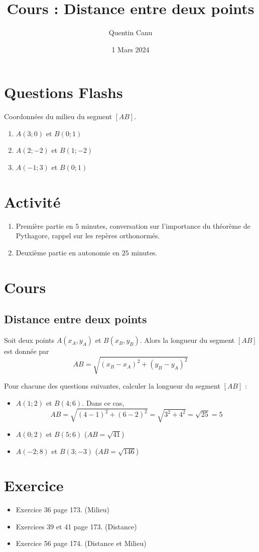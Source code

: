 \documentclass{article}
\author{Quentin Canu}
\date{1 Mars 2024}
\title{Cours : Distance entre deux points}
\begin{document}
\maketitle
\section{Questions Flashs}
Coordonnées du milieu du segment $[AB]$.
\begin{enumerate}
\item $A(3;0)$ et $B(0;1)$
\item $A(2;-2)$ et $B(1;-2)$
\item $A(-1;3)$ et $B(0;1)$
\end{enumerate}

\section{Activité}
\begin{enumerate}
\item Première partie en $5$ minutes, conversation sur l'importance du théorème de Pythagore, rappel sur les repères orthonormés.
\item Deuxième partie en autonomie en $25$ minutes. 
\end{enumerate}
\section{Cours}
\subsection*{Distance entre deux points}
\begin{proposition}
Soit deux points $A(x_A,y_A)$ et $B(x_B,y_B)$. Alors la longueur du segment $[AB]$ est donnée par
\begin{equation*}
AB = \sqrt{(x_B - x_A)^2 + (y_B - y_A)^2}
\end{equation*}
\end{proposition}
\begin{example}
Pour chacune des questions suivantes, calculer la longueur du segment $[AB]$ :
\begin{itemize}
\item $A(1;2)$ et $B(4;6)$. Dans ce cas,
\begin{equation*}
AB = \sqrt{(4 - 1)^2 + (6 - 2)^2} = \sqrt{3^2 + 4^2} = \sqrt{25} = 5
\end{equation*}
\item $A(0;2)$ et $B(5;6)$ ($AB = \sqrt{41}$)
\item $A(-2;8)$ et $B(3;-3)$ ($AB = \sqrt{146}$)
\end{itemize}
\end{example}
\section{Exercice}
\begin{itemize}
\item Exercice 36 page 173. (Milieu)
\item Exercices 39 et 41 page 173. (Distance)
\item Exercice 56 page 174. (Distance et Milieu)
\end{itemize}
\end{document}
